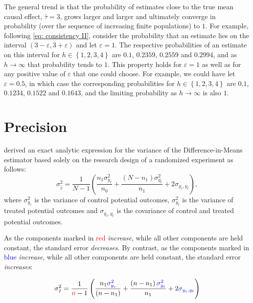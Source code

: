 \documentclass[12pt,leqno]{article}
\theoremstyle{newstyle}
\begin{document}
The general trend is that the probability of estimates close to the true
mean causal effect, \(\bar{\tau} = 3\), grows larger and larger and
ultimately converge in probability (over the sequence of increasing
finite populations) to \(1\). For example, following
\cref{eq: consistency II}, consider the probability that an estimate
lies on the interval \(\left(3 - \varepsilon, 3 + \varepsilon \right)\)
and let \(\varepsilon = 1\). The respective probabilities of an estimate
on this interval for \(h \in \left\{1, 2, 3, 4\right\}\) are \(0.1\),
\(0.2359\), \(0.2559\) and \(0.2994\), and as \(h \to \infty\) that
probability tends to \(1\). This property holds for \(\varepsilon = 1\)
as well as for any positive value of \(\varepsilon\) that one could
choose. For example, we could have let \(\varepsilon = 0.5\), in which
case the corresponding probabilities for
\(h \in \left\{1, 2, 3, 4\right\}\) are \(0.1\), \(0.1234\), \(0.1522\)
and \(0.1643\), and the limiting probability as \(h \to \infty\) is also
\(1\).

\section{Precision}

\citet{neyman1923} derived an exact analytic expression for the variance
of the Difference-in-Means estimator based solely on the research design
of a randomized experiment as follows: \begin{equation}
\sigma^2_{\hat{\bar{\tau}}} = \frac{1}{N - 1}\left(\frac{n_1 \sigma^2_{y_c}}{n_0} + \frac{\left(N - n_1\right) \sigma^2_{y_t}}{n_1} + 2\sigma_{y_c, y_t}\right),
\label{eq: var}
\end{equation} where \(\sigma^2_{y_c}\) is the variance of control
potential outcomes, \(\sigma^2_{y_t}\) is the variance of treated
potential outcomes and \(\sigma_{y_c, y_t}\) is the covariance of
control and treated potential outcomes.

As the components marked in \textcolor{red}{red} \textit{increase},
while all other components are held constant, the standard error
\textit{decreases}. By contrast, as the components marked in
\textcolor{blue}{blue} \textit{increase}, while all other components are
held constant, the standard error \textit{increases}:

\begin{equation*}
\sigma^2_{\hat{\bar{\tau}}} = \frac{1}{\textcolor{red}{n} - 1}\left(\frac{n_1 \textcolor{blue}{\sigma^2_{y_c}}}{\left(n - n_1\right)} + \frac{\left(n - n_1\right) \textcolor{blue}{\sigma^2_{y_t}}}{n_1} + 2\textcolor{blue}{\sigma_{y_c, y_t}}\right)
\end{equation*}
\end{document}
